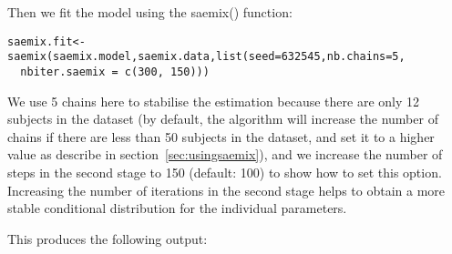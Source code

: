 Then we fit the model using the {\sf saemix()} function:
\begin{verbatim}
saemix.fit<-saemix(saemix.model,saemix.data,list(seed=632545,nb.chains=5,
  nbiter.saemix = c(300, 150)))
\end{verbatim}
We use 5 chains here to stabilise the estimation because there are only 12 subjects in the dataset (by default, the algorithm will increase the number of chains if there are less than 50 subjects in the dataset, and set it to a higher value as describe in section~\ref{sec:usingsaemix}), and we increase the number of steps in the second stage to 150 (default: 100) to show how to set this option. Increasing the number of iterations in the second stage helps to obtain a more stable conditional distribution for the individual parameters.

This produces the following output:

